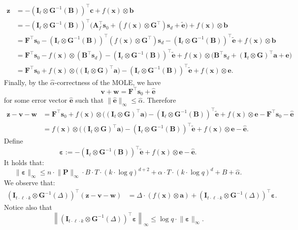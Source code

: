 \documentclass{theoretics}
\newcommand{\id}{\ensuremath{\mathbf{I}}}
\begin{document}
\begin{align*}
\mathbf{z}
&=-(\id_\ell\otimes \mathbf{G}^{-1}(\mathbf{B}))^\intercal \mathbf{c}+f(\mathbf{x})\otimes \mathbf{b}\\
&=-(\id_\ell\otimes \mathbf{G}^{-1}(\mathbf{B}))^\intercal
\bigl(\mathbf{A}_f^\intercal \mathbf{s}_0+(f(\mathbf{x})\otimes \mathbf{G}^\intercal)\mathbf{s}_d+\widetilde{\mathbf e}\bigr)
+f(\mathbf{x})\otimes \mathbf{b}\\
&=\mathbf{F}^\intercal \mathbf{s}_0
-(\id_\ell\otimes \mathbf{G}^{-1}(\mathbf{B}))^\intercal (f(\mathbf{x})\otimes \mathbf{G}^\intercal)\mathbf{s}_d
-(\id_\ell\otimes \mathbf{G}^{-1}(\mathbf{B}))^\intercal \widetilde{\mathbf e}
+f(\mathbf{x})\otimes \mathbf{b}\\
&=\mathbf{F}^\intercal \mathbf{s}_0
-f(\mathbf{x})\otimes (\mathbf{B}^\intercal \mathbf{s}_d)
-(\id_\ell\otimes \mathbf{G}^{-1}(\mathbf{B}))^\intercal \widetilde{\mathbf e}
+f(\mathbf{x})\otimes
\bigl(\mathbf{B}^\intercal \mathbf{s}_d+(\id_t\otimes \mathbf{G})^\intercal\mathbf{a}+\mathbf e\bigr)\\
&=\mathbf{F}^\intercal \mathbf{s}_0
+f(\mathbf{x})\otimes\bigl((\id_t\otimes \mathbf{G})^\intercal\mathbf a\bigr)
-(\id_\ell\otimes \mathbf{G}^{-1}(\mathbf{B}))^\intercal \widetilde{\mathbf e}
+f(\mathbf{x})\otimes \mathbf e.
\end{align*}
    Finally, by the $\hat{\alpha}$-correctness of the MOLE, we have
\[
\mathbf{v}+\mathbf{w}=\mathbf{F}^\intercal\mathbf{s}_0+\widehat{\mathbf e}
\]
for some error vector $\widehat{\mathbf e}$ such that $\lVert \widehat{\mathbf e}\rVert_\infty\le \hat{\alpha}$. Therefore
\begin{align*}
\mathbf{z}-\mathbf{v}-\mathbf{w}
&=\mathbf{F}^\intercal \mathbf{s}_0
+f(\mathbf{x})\otimes\bigl((\id_t\otimes \mathbf{G})^\intercal\mathbf a\bigr)
-(\id_\ell\otimes \mathbf{G}^{-1}(\mathbf{B}))^\intercal \widetilde{\mathbf e}
+f(\mathbf{x})\otimes \mathbf e
-\mathbf{F}^\intercal\mathbf{s}_0-\widehat{\mathbf e}\\
&=f(\mathbf{x})\otimes\bigl((\id_t\otimes \mathbf{G})^\intercal\mathbf a\bigr)
-(\id_\ell\otimes \mathbf{G}^{-1}(\mathbf{B}))^\intercal \widetilde{\mathbf e}
+f(\mathbf{x})\otimes \mathbf e
-\widehat{\mathbf e}.
\end{align*}
Define
\[
\bm\varepsilon:=-(\id_\ell\otimes \mathbf{G}^{-1}(\mathbf{B}))^\intercal \widetilde{\mathbf e}
+f(\mathbf{x})\otimes \mathbf e
-\widehat{\mathbf e}.
\] It holds that:
    \[\lVert\bm{\varepsilon}\rVert_\infty\le n\cdot \lVert \mathbf{P}\rVert_\infty\cdot B\cdot T\cdot (k\cdot \log q)^{d+2}+\alpha\cdot T\cdot (k\cdot \log q)^{d}+B+\hat{\alpha}.\]
    We observe that:
    \begin{align*}
(\id_{t\cdot \ell\cdot k}\otimes \mathbf{G}^{-1}(\Delta))^\intercal(\mathbf{z}-\mathbf{v}-\mathbf{w})
&=\Delta\cdot (f(\mathbf{x})\otimes \mathbf a)
+(\id_{t\cdot \ell\cdot k}\otimes \mathbf{G}^{-1}(\Delta))^\intercal\bm\varepsilon.
\end{align*}
Notice also that
\[
\left\lVert(\id_{t\cdot \ell\cdot k}\otimes \mathbf{G}^{-1}(\Delta))^\intercal\bm\varepsilon\right\rVert_\infty
\le \log q\cdot \lVert\bm\varepsilon\rVert_\infty.
\]
\end{document}
